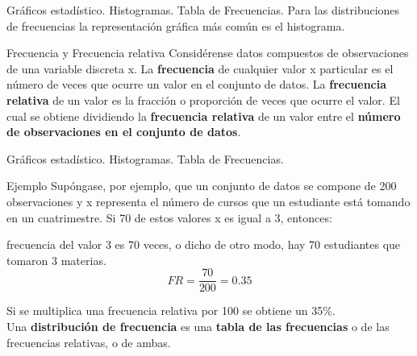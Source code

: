 \documentclass[11pt]{beamer}
\begin{document}
      \begin{frame}{Gráficos estadístico. Histogramas. Tabla de Frecuencias.}
          Para las distribuciones de frecuencias la representación gráfica más común es el histograma.
          \begin{block}{Frecuencia y Frecuencia relativa}
              Considérense datos compuestos de observaciones de una variable discreta x. La\textbf{ frecuencia} de cualquier valor x particular es el número de veces que ocurre un valor en el conjunto de datos. La \textbf{frecuencia relativa} de un valor es la fracción o proporción de veces que
ocurre el valor. El cual se obtiene dividiendo la \textbf{frecuencia relativa} de un valor entre el \textbf{número de observaciones en el conjunto de datos}.

          \end{block}
      \end{frame}

      \begin{frame}{Gráficos estadístico. Histogramas. Tabla de Frecuencias.}

        \begin{block}{Ejemplo}
          Supóngase, por ejemplo, que un conjunto de datos se compone de 200 observaciones y x representa el número de cursos que un estudiante está tomando en un cuatrimestre. Si 70 de estos valores x es igual a 3, entonces:

          \pause
          frecuencia del valor 3 es 70 veces, o dicho de otro modo, hay 70 estudiantes que tomaron 3 materias.
          \pause
          $$FR =\dfrac{70}{200}= 0.35$$

          Si se multiplica una frecuencia relativa por 100 se obtiene un 35\%.\\
          \pause
          Una \textbf{distribución de frecuencia} es una \textbf{tabla de las frecuencias} o de las frecuencias relativas, o de ambas.
       \end{block}
      \end{frame}
\end{document}
